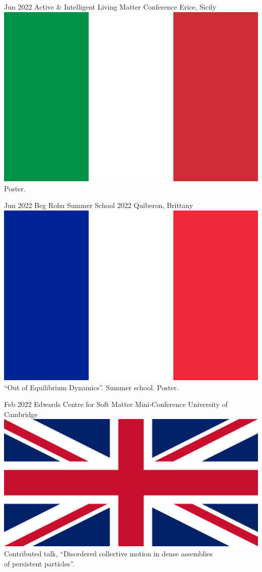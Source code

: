 \documentclass[letterpaper]{cvtemplate_en} %
\begin{document}
\begin{cvbody}
\cvitem
	{Jun 2022}
	{}
	{Active \& Intelligent Living Matter Conference}
	{Erice, Sicily \includegraphics[height=0.8\myheight]{it}}
	{}{}{}
	{}
	{Poster.\\}

\cvitem
	{Jun 2022}
	{}
	{Beg Rohu Summer School 2022}
	{Quiberon, Brittany \includegraphics[height=0.8\myheight]{fr}}
	{}{}{}
	{}
	{``Out of Equilibrium Dynamics''. Summer school. Poster.\\}

\cvitem
	{Feb 2022}
	{}
	{Edwards Centre for Soft Matter Mini-Conference}
	{University of Cambridge \includegraphics[height=0.8\myheight]{uk}}
	{}{}{}
	{}
	{Contributed talk, ``Disordered collective motion in dense assemblies\\ of persistent particles''.\\}


\end{cvbody}
\end{document}
